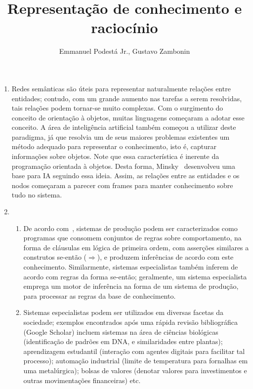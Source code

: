 \documentclass{../../sftex/sftex}
\title{Representação de conhecimento e raciocínio}
\author{Emmanuel Podestá Jr., Gustavo Zambonin}
\begin{document}
\maketitle

\begin{enumerate}[label= (\textbf{\arabic*})]

    \item Redes semânticas são úteis para representar naturalmente relações
        entre entidades; contudo, com um grande aumento nas tarefas a serem
        resolvidas, tais relações podem tornar-se muito complexas. Com o
        surgimento do conceito de orientação à objetos, muitas linguagens
        começaram a adotar esse conceito. A área de inteligência artificial
        também começou a utilizar deste paradigma, já que resolvia um de seus
        maiores problemas existentes um método adequado para representar o
        conhecimento, isto é, capturar informações sobre objetos. Note que
        essa característica é inerente da programação orientada à objetos.
        Desta forma, Minsky~\cite{1975:MFS:980190.980222} desenvolveu uma
        base para IA seguindo essa ideia. Assim, as relações entre as
        entidades e os nodos começaram a parecer com frames para manter
        conhecimento sobre tudo no sistema.

    \item

        \begin{enumerate}

            \item De acordo com~\cite[p. 23, 336]{Russell:2009:AIM:1671238},
                sistemas de produção podem ser caracterizados como programas
                que consomem conjuntos de regras sobre comportamento, na forma
                de cláusulas em lógica de primeira ordem, com asserções
                similares a construtos se-então ($\Rightarrow$), e produzem
                inferências de acordo com este conhecimento. Similarmente,
                sistemas especialistas também inferem de acordo com regras da
                forma se-então; geralmente, um sistema especialista emprega um
                motor de inferência na forma de um sistema de produção, para
                processar as regras da base de conhecimento.

            \item Sistemas especialistas podem ser utilizados em diversas
                facetas da sociedade; exemplos encontrados após uma rápida
                revisão bibliográfica (Google Scholar) incluem sistemas na
                área de ciências biológicas (identificação de padrões em DNA,
                e similaridades entre plantas); aprendizagem estudantil
                (interação com agentes digitais para facilitar tal processo);
                automação industrial (limite de temperatura para fornalhas em
                uma metalúrgica); bolsas de valores (denotar valores para
                investimentos e outras movimentações financeiras) etc.


\end{enumerate}
\end{enumerate}
\end{document}
